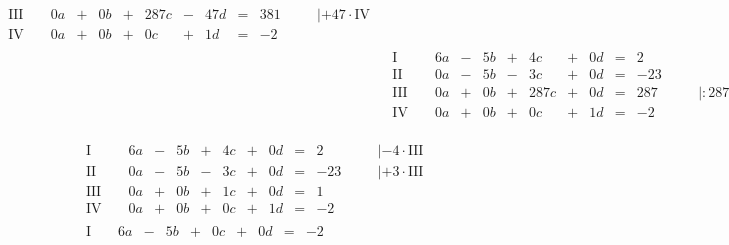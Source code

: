 \begin{exercise}
\begin{minipage}[t]{0.49\linewidth}
\begin{align*}
\begin{array}{r|rrrrrrrrrrrl}
        \text{III}{\,} & {\,} & \num{0}a & + & \num{0}b & + & \num{287}c & - & \num{47}d & = & \num{381} & {\quad} & |+\num{47}\cdot\text{IV} \\
         \text{IV}{\,} & {\,} & \num{0}a & + & \num{0}b & + &   \num{0}c & + &  \num{1}d & = &  -\num{2} & {\quad} &
        \end{array}
        \\[1ex]&
        \begin{array}{r|rrrrrrrrrrrl}
          \text{I}{\,} & {\,} & \num{6}a & - & \num{5}b & + &   \num{4}c & + & \num{0}d & = &   \num{2} & {\quad} &             \\
         \text{II}{\,} & {\,} & \num{0}a & - & \num{5}b & - &   \num{3}c & + & \num{0}d & = & -\num{23} & {\quad} &             \\
        \text{III}{\,} & {\,} & \num{0}a & + & \num{0}b & + & \num{287}c & + & \num{0}d & = & \num{287} & {\quad} & |:\num{287} \\
         \text{IV}{\,} & {\,} & \num{0}a & + & \num{0}b & + &   \num{0}c & + & \num{1}d & = &  -\num{2} & {\quad} &
        \end{array}
        \end{align*}
      \end{minipage}%
      \hfill
      \begin{minipage}[t]{0.49\linewidth}
        \vspace*{-\abovedisplayskip}
        \begin{align*}
        &
        \begin{array}{r|rrrrrrrrrrrl}
          \text{I}{\,} & {\,} & \num{6}a & - & \num{5}b & + & \num{4}c & + & \num{0}d & = &   \num{2} & {\quad} & |-\num{4}\cdot\text{III} \\
         \text{II}{\,} & {\,} & \num{0}a & - & \num{5}b & - & \num{3}c & + & \num{0}d & = & -\num{23} & {\quad} & |+\num{3}\cdot\text{III} \\
        \text{III}{\,} & {\,} & \num{0}a & + & \num{0}b & + & \num{1}c & + & \num{0}d & = &   \num{1} & {\quad} &                          \\
         \text{IV}{\,} & {\,} & \num{0}a & + & \num{0}b & + & \num{0}c & + & \num{1}d & = &  -\num{2} & {\quad} &
        \end{array}
        \\[1ex]&
        \begin{array}{r|rrrrrrrrrrrl}
          \text{I}{\,} & {\,} & \num{6}a & - & \num{5}b & + & \num{0}c & + & \num{0}d & = &  -\num{2} & {\quad} &                         \\

\end{array}
\end{align*}
\end{minipage}
\end{exercise}
